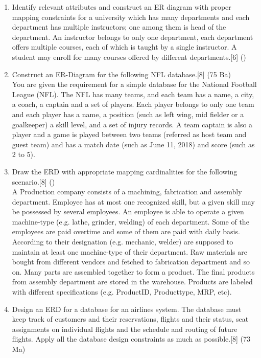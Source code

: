 \documentclass[12pt]{article}
\begin{document}
\begin{enumerate}
    \item Identify relevant attributes and construct an ER diagram with proper mapping constraints for a university which has many departments and each department has multiple instructors; one among them is head of the department. An instructor belongs to only one department, each department offers multiple courses, each of which is taught by a single instructor. A student may enroll for many courses offered by different departments.\hfill[6] ()

    \item Construct an ER-Diagram for the following NFL database.\hfill[8] (75 Ba)\\
    You are given the requirement for a simple database for the National Football League (NFL). The NFL has many teams, and each team has a name, a city, a coach, a captain and a set of players. Each player belongs to only one team and each player has a name, a position (such as left wing, mid fielder or a goalkeeper) a skill level, and a set of injury records. A team captain is also a player and a game is played between two teams (referred as host team and guest team) and has a match date (such as June 11, 2018) and score (such as 2 to 5).

    \item Draw the ERD with appropriate mapping cardinalities for the following scenario.\hfill[8] ()\\
    A Production company consists of a machining, fabrication and assembly department. Employee has at most one recognized skill, but a given skill may be possessed by several employees. An employee is able to operate a given machine-type (e.g. lathe, grinder, welding) of each department. Some of the employees are paid overtime and some of them are paid with daily basis. According to their designation (e.g. mechanic, welder) are supposed to maintain at least one machine-type of their department. Raw materials are bought from different vendors and fetched to fabrication department and so on. Many parts are assembled together to form a product. The final products from assembly department are stored in the warehouse. Products are labeled with different specifications (e.g. Product\textunderscore ID, Product\textunderscore type, MRP, etc).

    \item Design an ERD for a database for an airlines system. The database must keep track of customers and their reservations, flights and their status, seat assignments on individual flights and the schedule and routing of future flights. Apply all the database design constraints as much as possible.\hfill[8] (73 Ma)


\end{enumerate}
\end{document}
